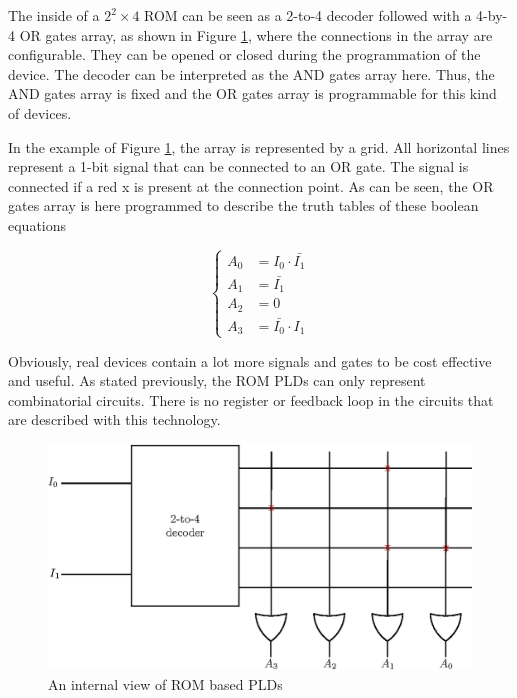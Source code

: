 The inside of a $2^2 \times 4$ ROM can be seen as a 2-to-4 decoder followed with a 4-by-4 OR gates 
array, as shown in Figure \ref{fig:fpga/pld_rom_internal}, where the connections in the array are configurable. They can be opened or closed during the
programmation of the device. The decoder can be interpreted as the AND gates array here. Thus, the
AND gates array is fixed and the OR gates array is programmable for this kind of devices.

In the example of Figure \ref{fig:fpga/pld_rom_internal}, the array is represented by a grid. All horizontal lines represent a 1-bit signal
that can be connected to an OR gate. The signal is connected if a red x is present at the connection
point. As can be seen, the OR gates array is here programmed to describe the truth tables of these 
boolean equations

\begin{equation*}
    \begin{cases}
        A_0& = I_0 \cdot \bar{I_1} \\
        A_1& = \bar{I_1} \\
        A_2& = 0 \\
        A_3& = \bar{I_0} \cdot I_1
    \end{cases}
\end{equation*}

Obviously, real devices contain a lot more signals and gates to be cost effective and useful. 
As stated previously, the ROM PLDs can only represent combinatorial circuits. There is no register
or feedback loop in the circuits that are described with this technology.

\begin{figure}[H]
    \centering
    \includegraphics[scale=0.8]{Chapter1-Hardware/res/pld_rom_internal}
    \caption{An internal view of ROM based PLDs}
    \label{fig:fpga/pld_rom_internal}
\end{figure}

